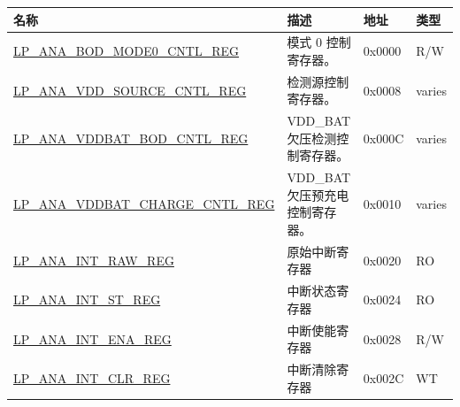 \begin{longtable}{ | p{6cm} | p{7.2cm} | p{1.3cm} | p{1cm} | }
\hline\rowcolor{lightgray}
名称 & 描述 &  地址 & 类型 \\ \hline
\endhead
\hyperref[regdesc:LPANABODMODE0CNTLREG]{LP\_ANA\_BOD\_MODE0\_CNTL\_REG} & 模式 0 控制寄存器。 & 0x0000 & R/W \\ \hline
\hyperref[regdesc:LPANAVDDSOURCECNTLREG]{LP\_ANA\_VDD\_SOURCE\_CNTL\_REG} & 检测源控制寄存器。 & 0x0008 & varies \\ \hline
\hyperref[regdesc:LPANAVDDBATBODCNTLREG]{LP\_ANA\_VDDBAT\_BOD\_CNTL\_REG} & VDD\_BAT 欠压检测控制寄存器。 & 0x000C & varies \\ \hline
\hyperref[regdesc:LPANAVDDBATCHARGECNTLREG]{LP\_ANA\_VDDBAT\_CHARGE\_CNTL\_REG} & VDD\_BAT 欠压预充电控制寄存器。 & 0x0010 & varies \\ \hline
\hyperref[regdesc:LPANAINTRAWREG]{LP\_ANA\_INT\_RAW\_REG} & 原始中断寄存器 & 0x0020 & RO \\ \hline
\hyperref[regdesc:LPANAINTSTREG]{LP\_ANA\_INT\_ST\_REG} & 中断状态寄存器 & 0x0024 & RO \\ \hline
\hyperref[regdesc:LPANAINTENAREG]{LP\_ANA\_INT\_ENA\_REG} & 中断使能寄存器 & 0x0028 & R/W \\ \hline
\hyperref[regdesc:LPANAINTCLRREG]{LP\_ANA\_INT\_CLR\_REG} & 中断清除寄存器 & 0x002C & WT \\ \hline
\end{longtable}